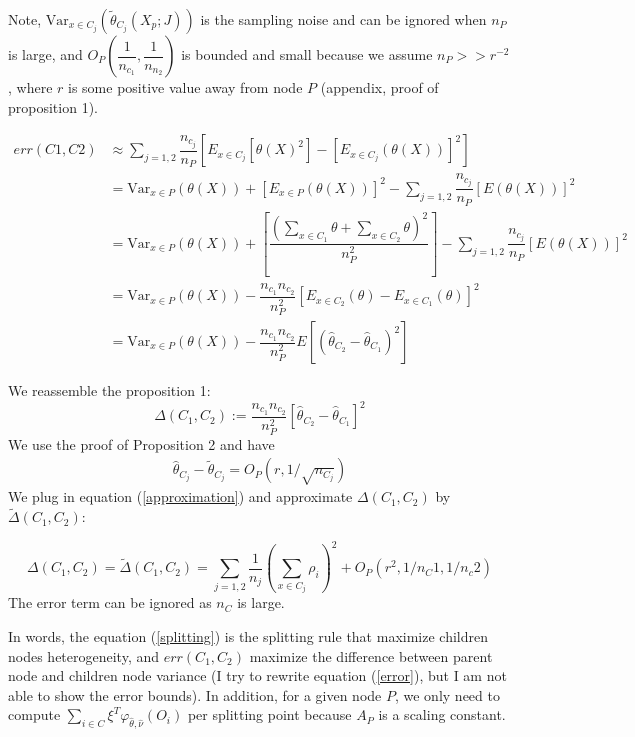 \documentclass[12pt,letterpaper]{article}
\newcommand{\var}{\mathrm{Var }}
\begin{document}
Note, $  \var_{x \in C_{j}}(\tilde{\theta}_{C_j}(X_{p};J)) $ is the sampling noise and can be ignored when $ n_P $ is large, and $ O_P(\dfrac{1}{n_{c_1}}, \dfrac{1}{n_{n_2}}) $ is bounded and small because we assume $ n_P >> r^{-2} $, where $ r $ is some positive value away from node $ P $ (appendix, proof of proposition 1).

\begin{equation}
	\begin{aligned}\label{key}
		err(C1, C2) & \approx \sum\limits_{j=1,2} \dfrac{n_{c_j}}{n_{P}}[ E_{x\in C_j}[\theta(X)^2] - [E_{x\in C_j}(\theta(X))]^2  ] \\
		& = \var_{x\in P}(\theta(X)) +  [E_{x \in P} (\theta(X))]^2 - \sum\limits_{j=1,2}\dfrac{n_{c_j}}{n_{P}}[E(\theta(X))]^2 \\
		& = \var_{x\in P}(\theta(X)) +  [\dfrac{(\sum_{x \in C_1}\theta + \sum_{x \in C_2}\theta)^2}{n_{P}^2} ] - \sum\limits_{j=1,2}\dfrac{n_{c_j}}{n_{P}}[E(\theta(X))]^2 \\
		& =  \var_{x\in P}(\theta(X)) - \dfrac{n_{c_1}n_{c_2}}{n_{P}^2} [ E_{x\in C_2}(\theta) - E_{x \in C_1}(\theta)]^2 \\
		& = \var_{x\in P}(\theta(X)) - \dfrac{n_{c_1}n_{c_2}}{n_{P}^2} E[ (\hat{\theta}_{C_2} - \hat{\theta}_{C_1})^2]
	\end{aligned}
\end{equation}


We reassemble the proposition 1:
\begin{equation}\label{key}
 \Delta(C_1, C_2)	:= \dfrac{n_{c_1}n_{c_2}}{n_{P}^2} [ \hat{\theta}_{C_2} - \hat{\theta}_{C_1} ]^2
\end{equation}
We use the proof of Proposition 2 and have 
\begin{align}\label{key}
	\hat{\theta}_{C_j} - \tilde{\theta}_{C_j} = O_P(r, 1/\sqrt{n_{C_j}}) 
\end{align}
We plug in equation (\ref{approximation}) and approximate $ \Delta(C_1, C_2) $ by $ \tilde{\Delta}(C_1, C_2) $:

\begin{equation}\label{splitting}
	 \Delta(C_1, C_2) = \tilde{\Delta}(C_1, C_2) = \sum\limits_{j=1,2} \dfrac{1}{n_j}( \sum\limits_{x \in C_j} \rho_{i}  )^2 + O_P(r^2, 1/n_C1, 1/n_c2)
\end{equation}
The error term can be ignored as $ n_C $ is large. 

In words, the equation (\ref{splitting}) is the splitting rule that maximize children nodes heterogeneity, and $ err(C_1, C_2) $ maximize the difference between parent node and children node variance (I try to rewrite equation (\ref{error}), but I am not able to show the error bounds). In addition, for a given node $ P $, we only need to compute $ \sum\limits_{i \in C} \xi^T \varphi_{\hat{\theta}, \hat{\nu}}(O_{i}) $ per splitting point because $ A_P $ is a scaling constant. 
\end{document}
